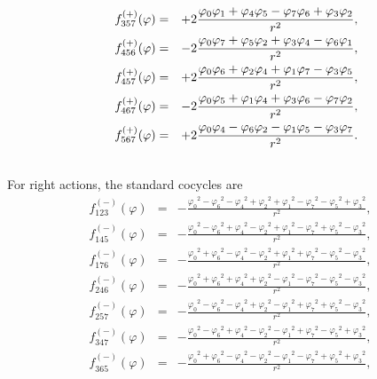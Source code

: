 \documentclass[a4paper,12pt]{book}
\begin{document}
\begin{eqnarray}
{\quad {f}_{357}^{(+)}{(\varphi )}} &=&+2{\frac{{\varphi _{0}}{\varphi _{1}}+%
{\varphi _{4}}{\varphi _{5}}-{\varphi _{7}}{\varphi _{6}}+{\varphi _{3}}{%
\varphi _{2}}}{r^{2}},}  \nonumber \\
{{f}_{456}^{(+)}{(\varphi )}} &=&-2{\frac{{\varphi _{0}}{\varphi _{7}}+{%
\varphi _{5}}{\varphi _{2}}+{\varphi _{3}}{\varphi _{4}}-{\varphi _{6}}{%
\varphi _{1}}}{r^{2}},}  \nonumber \\
{\quad {f}_{457}^{(+)}{(\varphi )}} &=&+2{\frac{{\varphi _{0}}{\varphi _{6}}+%
{\varphi _{2}}{\varphi _{4}}+{\varphi _{1}}{\varphi _{7}}-{\varphi _{3}}{%
\varphi _{5}}}{r^{2}},}  \nonumber \\
{{f}_{467}^{(+)}{(\varphi )}} &=&-2{\frac{{\varphi _{0}}{\varphi _{5}}+{%
\varphi _{1}}{\varphi _{4}}+{\varphi _{3}}{\varphi _{6}}-{\varphi _{7}}{%
\varphi _{2}}}{r^{2}},}  \nonumber \\
{\quad {f}_{567}^{(+)}{(\varphi )}} &=&+2{\frac{{\varphi _{0}}{\varphi _{4}}-%
{\varphi _{6}}{\varphi _{2}}-{\varphi _{1}}{\varphi _{5}}-{\varphi _{3}}{%
\varphi _{7}}}{r^{2}}.}  \nonumber \\
&&
\end{eqnarray}
For right actions, the standard cocycles are 
\begin{eqnarray}
{{f}_{123}^{(-)}{(\varphi )}} &=&-{\frac{{\varphi _{0}}^{2}-{\varphi _{6}}%
^{2}-{\varphi _{4}}^{2}+{\varphi _{2}}^{2}+{\varphi _{1}}^{2}-{\varphi _{7}}%
^{2}-{\varphi _{5}}^{2}+{\varphi _{3}}^{2}}{r^{2}},}  \nonumber \\
{{f}_{145}^{(-)}{(\varphi )}} &=&-{\frac{{\varphi _{0}}^{2}-{\varphi _{6}}%
^{2}+{\varphi _{4}}^{2}-{\varphi _{2}}^{2}+{\varphi _{1}}^{2}-{\varphi _{7}}%
^{2}+{\varphi _{5}}^{2}-{\varphi _{3}}^{2}}{r^{2}},}  \nonumber \\
{{f}_{176}^{(-)}{(\varphi )}} &=&-{\frac{{\varphi _{0}}^{2}+{\varphi _{6}}%
^{2}-{\varphi _{4}}^{2}-{\varphi _{2}}^{2}+{\varphi _{1}}^{2}+{\varphi _{7}}%
^{2}-{\varphi _{5}}^{2}-{\varphi _{3}}^{2}}{r^{2}},}  \nonumber \\
{{f}_{246}^{(-)}{(\varphi )}} &=&-{\frac{{\varphi _{0}}^{2}+{\varphi _{6}}%
^{2}+{\varphi _{4}}^{2}+{\varphi _{2}}^{2}-{\varphi _{1}}^{2}-{\varphi _{7}}%
^{2}-{\varphi _{5}}^{2}-{\varphi _{3}}^{2}}{{r^{2}}},}  \nonumber \\
{{f}_{257}^{(-)}{(\varphi )}} &=&-{\frac{{\varphi _{0}}^{2}-{\varphi _{6}}%
^{2}-{\varphi _{4}}^{2}+{\varphi _{2}}^{2}-{\varphi _{1}}^{2}+{\varphi _{7}}%
^{2}+{\varphi _{5}}^{2}-{\varphi _{3}}^{2}}{{r^{2}}},}  \nonumber \\
{{f}_{347}^{(-)}{(\varphi )}} &=&-{\frac{{\varphi _{0}}^{2}-{\varphi _{6}}%
^{2}+{\varphi _{4}}^{2}-{\varphi _{2}}^{2}-{\varphi _{1}}^{2}+{\varphi _{7}}%
^{2}-{\varphi _{5}}^{2}+{\varphi _{3}}^{2}}{r^{2}},}  \nonumber \\
{{f}_{365}^{(-)}{(\varphi )}} &=&-{\frac{{\varphi _{0}}^{2}+{\varphi _{6}}%
^{2}-{\varphi _{4}}^{2}-{\varphi _{2}}^{2}-{\varphi _{1}}^{2}-{\varphi _{7}}%
^{2}+{\varphi _{5}}^{2}+{\varphi _{3}}^{2}}{r^{2}},}  \nonumber \\
&&
\end{eqnarray}
\end{document}

